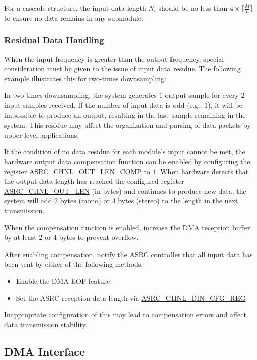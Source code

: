 \documentclass[main\_\_EN.tex]{subfiles}
\begin{document}
For a cascade structure, the input data length $N_i$ should be no less than $4 \times \lceil \frac{M}{L} \rceil$ to ensure no data remains in any submodule.

\subsubsection{Residual Data Handling}

When the input frequency is greater than the output frequency, special consideration must be given to the issue of input data residue. The following example illustrates this for two-times downsampling:

In two-times downsampling, the system generates $1$ output sample for every $2$ input samples received. If the number of input data is odd (e.g., $1$), it will be impossible to produce an output, resulting in the last sample remaining in the system. This residue may affect the organization and parsing of data packets by upper-level applications.

If the condition of no data residue for each module's input cannot be met, the hardware output data compensation function can be enabled by configuring the register \hyperref[fielddesc:ASRCCHNL0OUTLENCOMP]{ASRC\_CHNL\_OUT\_LEN\_COMP} to $1$. When hardware detects that the output data length has reached the configured register \hyperref[fielddesc:ASRCCHNL0OUTLEN]{ASRC\_CHNL\_OUT\_LEN} (in bytes) and continues to produce new data, the system will add $2$ bytes (mono) or $4$ bytes (stereo) to the length in the next transmission.

When the compensation function is enabled, increase the DMA reception buffer by at least $2$ or $4$ bytes to prevent overflow.

After enabling compensation, notify the ASRC controller that all input data has been sent by either of the following methods:

\begin{itemize}
    \item Enable the DMA EOF feature
    \item Set the ASRC reception data length via \hyperref[regdesc:ASRCCHNL0DINCFGREG]{ASRC\_CHNL\_DIN\_CFG\_REG}
\end{itemize}

Inappropriate configuration of this may lead to compensation errors and affect data transmission stability.


\subsection{DMA Interface}
\end{document}
